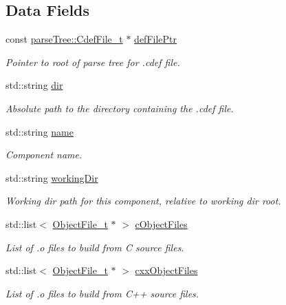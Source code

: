 \subsection*{Data Fields}
\begin{DoxyCompactItemize}
\item 
const \hyperlink{structparse_tree_1_1_cdef_file__t}{parse\+Tree\+::\+Cdef\+File\+\_\+t} $\ast$ \hyperlink{structmodel_1_1_component__t_a2c807d8e460fc0ca0e43c11563e12405}{def\+File\+Ptr}
\begin{DoxyCompactList}\small\item\em Pointer to root of parse tree for .cdef file. \end{DoxyCompactList}\item 
std\+::string \hyperlink{structmodel_1_1_component__t_a51d470c02bfb61e18526d8ebd6f5f565}{dir}
\begin{DoxyCompactList}\small\item\em Absolute path to the directory containing the .cdef file. \end{DoxyCompactList}\item 
std\+::string \hyperlink{structmodel_1_1_component__t_a66a236fad1cd7d1e8e3fee94fbdcad39}{name}
\begin{DoxyCompactList}\small\item\em Component name. \end{DoxyCompactList}\item 
std\+::string \hyperlink{structmodel_1_1_component__t_a8f3ef590b81796c76fba28b24b623e40}{working\+Dir}
\begin{DoxyCompactList}\small\item\em Working dir path for this component, relative to working dir root. \end{DoxyCompactList}\item 
std\+::list$<$ \hyperlink{structmodel_1_1_object_file__t}{Object\+File\+\_\+t} $\ast$ $>$ \hyperlink{structmodel_1_1_component__t_a10615ee192a04acde21775015e8f7619}{c\+Object\+Files}
\begin{DoxyCompactList}\small\item\em List of .o files to build from C source files. \end{DoxyCompactList}\item 
std\+::list$<$ \hyperlink{structmodel_1_1_object_file__t}{Object\+File\+\_\+t} $\ast$ $>$ \hyperlink{structmodel_1_1_component__t_a40972dcd1d504cd9ad8b242b078808f7}{cxx\+Object\+Files}
\begin{DoxyCompactList}\small\item\em List of .o files to build from C++ source files. \end{DoxyCompactList}\item 

\end{DoxyCompactItemize}
